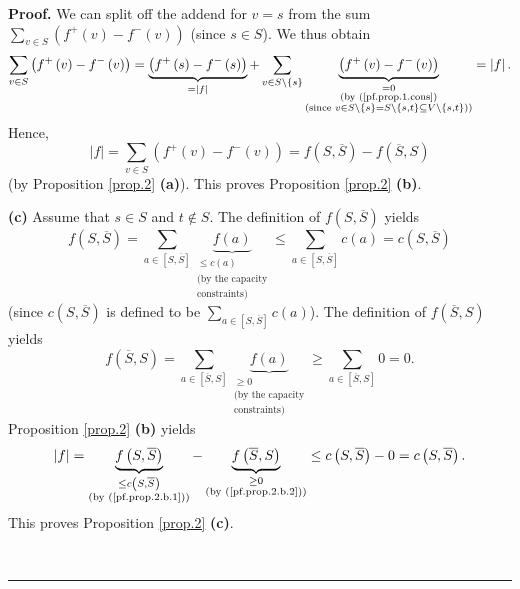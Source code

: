 \documentclass[numbers=enddot,12pt,final,onecolumn,notitlepage]{scrartcl}%
\theoremstyle{definition}
\newenvironment{proof}[1][Proof]{\noindent\textbf{#1.} }{\ \rule{0.5em}{0.5em}}
\let\sumnonlimits\sum
\renewcommand{\sum}{\sumnonlimits\limits}
\begin{document}
\begin{proof}
We can split off the addend for $v=s$ from the sum $\sum_{v\in S}\left(
f^{+}\left(  v\right)  -f^{-}\left(  v\right)  \right)  $ (since $s\in S$). We
thus obtain%
\[
\sum_{v\in S}\left(  f^{+}\left(  v\right)  -f^{-}\left(  v\right)  \right)
=\underbrace{\left(  f^{+}\left(  s\right)  -f^{-}\left(  s\right)  \right)
}_{=\left\vert f\right\vert }+\sum_{v\in S\setminus\left\{  s\right\}
}\underbrace{\left(  f^{+}\left(  v\right)  -f^{-}\left(  v\right)  \right)
}_{\substack{=0\\\text{(by (\ref{pf.prop.1.cons})}\\\text{(since }v\in
S\setminus\left\{  s\right\}  =S\setminus\left\{  s,t\right\}  \subseteq
V\setminus\left\{  s,t\right\}  \text{))}}}=\left\vert f\right\vert .
\]
Hence,%
\[
\left\vert f\right\vert =\sum_{v\in S}\left(  f^{+}\left(  v\right)
-f^{-}\left(  v\right)  \right)  =f\left(  S,\overline{S}\right)  -f\left(
\overline{S},S\right)
\]
(by Proposition \ref{prop.2} \textbf{(a)}). This proves Proposition
\ref{prop.2} \textbf{(b)}.

\textbf{(c)} Assume that $s\in S$ and $t\notin S$. The definition of $f\left(
S,\overline{S}\right)  $ yields%
\begin{equation}
f\left(  S,\overline{S}\right)  =\sum_{a\in\left[  S,\overline{S}\right]
}\underbrace{f\left(  a\right)  }_{\substack{\leq c\left(  a\right)
\\\text{(by the capacity}\\\text{constraints)}}}\leq\sum_{a\in\left[
S,\overline{S}\right]  }c\left(  a\right)  =c\left(  S,\overline{S}\right)
\label{pf.prop.2.b.1}%
\end{equation}
(since $c\left(  S,\overline{S}\right)  $ is defined to be $\sum_{a\in\left[
S,\overline{S}\right]  }c\left(  a\right)  $). The definition of $f\left(
\overline{S},S\right)  $ yields%
\begin{equation}
f\left(  \overline{S},S\right)  =\sum_{a\in\left[  \overline{S},S\right]
}\underbrace{f\left(  a\right)  }_{\substack{\geq0\\\text{(by the
capacity}\\\text{constraints)}}}\geq\sum_{a\in\left[  \overline{S},S\right]
}0=0. \label{pf.prop.2.b.2}%
\end{equation}
Proposition \ref{prop.2} \textbf{(b)} yields%
\[
\left\vert f\right\vert =\underbrace{f\left(  S,\overline{S}\right)
}_{\substack{\leq c\left(  S,\overline{S}\right)  \\\text{(by
(\ref{pf.prop.2.b.1}))}}}-\underbrace{f\left(  \overline{S},S\right)
}_{\substack{\geq0\\\text{(by (\ref{pf.prop.2.b.2}))}}}\leq c\left(
S,\overline{S}\right)  -0=c\left(  S,\overline{S}\right)  .
\]
This proves Proposition \ref{prop.2} \textbf{(c)}.


\end{proof}
\end{document}
